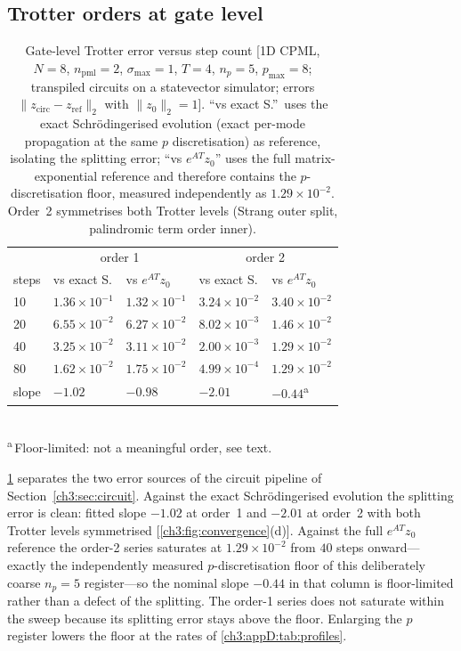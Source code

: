 \subsection{Trotter orders at gate level}
\label{ch3:appD:trotter}

\begin{table}
\caption{Gate-level Trotter error versus step count [1D CPML, $N=8$,
$n_{\mathrm{pml}}=2$, $\sigma_{\max}=1$, $T=4$, $n_p=5$, $p_{\max}=8$;
transpiled circuits on a statevector simulator; errors
$\lVert z_{\mathrm{circ}}-z_{\mathrm{ref}}\rVert_2$ with
$\lVert z_0\rVert_2=1$].  ``vs exact S.''\ uses the exact
Schr\"odingerised evolution (exact per-mode propagation at the same $p$
discretisation) as reference, isolating the splitting error; ``vs
$e^{AT}z_0$'' uses the full matrix-exponential reference and therefore
contains the $p$-discretisation floor, measured independently as
$1.29\times10^{-2}$.  Order~2 symmetrises both Trotter levels (Strang
outer split, palindromic term order inner).}
\label{ch3:appD:tab:trotter}
\begin{tabular}{lllll}
\toprule
 & \multicolumn{2}{c}{order 1} & \multicolumn{2}{c}{order 2} \\
steps & vs exact S. & vs $e^{AT}z_0$ & vs exact S. & vs $e^{AT}z_0$ \\
\midrule
10 & $1.36\times10^{-1}$ & $1.32\times10^{-1}$ & $3.24\times10^{-2}$ & $3.40\times10^{-2}$ \\
20 & $6.55\times10^{-2}$ & $6.27\times10^{-2}$ & $8.02\times10^{-3}$ & $1.46\times10^{-2}$ \\
40 & $3.25\times10^{-2}$ & $3.11\times10^{-2}$ & $2.00\times10^{-3}$ & $1.29\times10^{-2}$ \\
80 & $1.62\times10^{-2}$ & $1.75\times10^{-2}$ & $4.99\times10^{-4}$ & $1.29\times10^{-2}$ \\
\midrule
slope & $-1.02$ & $-0.98$ & $-2.01$ & $-0.44$\textsuperscript{a} \\
\bottomrule
\end{tabular}
\\[2pt]
{\footnotesize \textsuperscript{a}\,Floor-limited: not a meaningful order, see text.}
\end{table}

\ref{ch3:appD:tab:trotter} separates the two error sources of the
circuit pipeline of Section~\ref{ch3:sec:circuit}.  Against the exact
Schr\"odingerised evolution the splitting error is clean: fitted slope
$-1.02$ at order~1 and $-2.01$ at order~2 with both Trotter levels
symmetrised [\ref{ch3:fig:convergence}(d)].  Against the full
$e^{AT}z_0$ reference the order-2 series saturates at
$1.29\times10^{-2}$ from $40$ steps onward---exactly the independently
measured $p$-discretisation floor of this deliberately coarse $n_p=5$
register---so the nominal slope $-0.44$ in that column is
floor-limited rather than a defect of the splitting.  The order-1
series does not saturate within the sweep because its splitting error
stays above the floor.  Enlarging the $p$ register lowers the floor at
the rates of \ref{ch3:appD:tab:profiles}.

